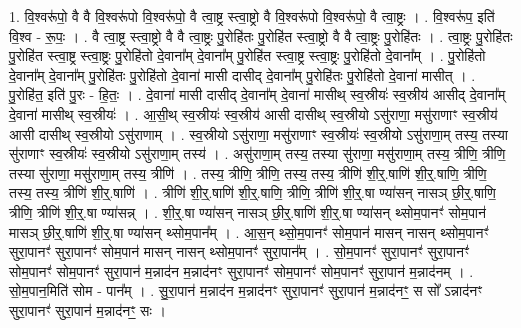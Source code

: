 \documentclass[17pt]{extarticle}
\begin{document}
1. वि॒श्वरू॑पो॒ वै वै वि॒श्वरू॑पो वि॒श्वरू॑पो॒ वै त्वा॒ष्ट्र स्त्वा॒ष्ट्रो वै वि॒श्वरू॑पो वि॒श्वरू॑पो॒ वै त्वा॒ष्ट्रः । . वि॒श्वरू॑प॒ इति॑ वि॒श्व - रू॒पः॒ । . वै त्वा॒ष्ट्र स्त्वा॒ष्ट्रो वै वै त्वा॒ष्ट्रः पु॒रोहि॑तः पु॒रोहि॑त स्त्वा॒ष्ट्रो वै वै त्वा॒ष्ट्रः पु॒रोहि॑तः । . त्वा॒ष्ट्रः पु॒रोहि॑तः पु॒रोहि॑त स्त्वा॒ष्ट्र स्त्वा॒ष्ट्रः पु॒रोहि॑तो दे॒वाना᳚म् दे॒वाना᳚म् पु॒रोहि॑त स्त्वा॒ष्ट्र स्त्वा॒ष्ट्रः पु॒रोहि॑तो दे॒वाना᳚म् । . पु॒रोहि॑तो दे॒वाना᳚म् दे॒वाना᳚म् पु॒रोहि॑तः पु॒रोहि॑तो दे॒वाना॑ मासी दासीद् दे॒वाना᳚म् पु॒रोहि॑तः पु॒रोहि॑तो दे॒वाना॑ मासीत् । . पु॒रोहि॑त॒ इति॑ पु॒रः - हि॒तः॒ । . दे॒वाना॑ मासी दासीद् दे॒वाना᳚म् दे॒वाना॑ मासीथ् स्व॒स्रीयः॑ स्व॒स्रीय॑ आसीद् दे॒वाना᳚म् दे॒वाना॑ मासीथ् स्व॒स्रीयः॑ । . आ॒सी॒थ् स्व॒स्रीयः॑ स्व॒स्रीय॑ आसी दासीथ् स्व॒स्रीयो ऽसु॑राणा॒ मसु॑राणाꣳ स्व॒स्रीय॑ आसी दासीथ् स्व॒स्रीयो ऽसु॑राणाम् । . स्व॒स्रीयो ऽसु॑राणा॒ मसु॑राणाꣳ स्व॒स्रीयः॑ स्व॒स्रीयो ऽसु॑राणा॒म् तस्य॒ तस्या सु॑राणाꣳ स्व॒स्रीयः॑ स्व॒स्रीयो ऽसु॑राणा॒म् तस्य॑ । . असु॑राणा॒म् तस्य॒ तस्या सु॑राणा॒ मसु॑राणा॒म् तस्य॒ त्रीणि॒ त्रीणि॒ तस्या सु॑राणा॒ मसु॑राणा॒म् तस्य॒ त्रीणि॑ । . तस्य॒ त्रीणि॒ त्रीणि॒ तस्य॒ तस्य॒ त्रीणि॑ शी॒र्॒.षाणि॑ शी॒र्॒.षाणि॒ त्रीणि॒ तस्य॒ तस्य॒ त्रीणि॑ शी॒र्॒.षाणि॑ । . त्रीणि॑ शी॒र्॒.षाणि॑ शी॒र्॒.षाणि॒ त्रीणि॒ त्रीणि॑ शी॒र्॒.षा ण्या॑सन् नासञ् छी॒र्॒.षाणि॒ त्रीणि॒ त्रीणि॑ शी॒र्॒.षा ण्या॑सन्न् । . शी॒र्॒.षा ण्या॑सन् नासञ् छी॒र्॒.षाणि॑ शी॒र्॒.षा ण्या॑सन् थ्सोम॒पानꣳ॑ सोम॒पान॑ मासञ् छी॒र्॒.षाणि॑ शी॒र्॒.षा ण्या॑सन् थ्सोम॒पान᳚म् । . आ॒स॒न् थ्सो॒म॒पानꣳ॑ सोम॒पान॑ मासन् नासन् थ्सोम॒पानꣳ॑ सुरा॒पानꣳ॑ सुरा॒पानꣳ॑ सोम॒पान॑ मासन् नासन् थ्सोम॒पानꣳ॑ सुरा॒पान᳚म् । . सो॒म॒पानꣳ॑ सुरा॒पानꣳ॑ सुरा॒पानꣳ॑ सोम॒पानꣳ॑ सोम॒पानꣳ॑ सुरा॒पान॑ म॒न्नाद॑न म॒न्नाद॑नꣳ सुरा॒पानꣳ॑ सोम॒पानꣳ॑ सोम॒पानꣳ॑ सुरा॒पान॑ म॒न्नाद॑नम् । . सो॒म॒पान॒मिति॑ सोम - पान᳚म् । . सु॒रा॒पान॑ म॒न्नाद॑न म॒न्नाद॑नꣳ सुरा॒पानꣳ॑ सुरा॒पान॑ म॒न्नाद॑नꣳ॒॒ स सो᳚ ऽन्नाद॑नꣳ सुरा॒पानꣳ॑ सुरा॒पान॑ म॒न्नाद॑नꣳ॒॒ सः । \newline
\end{document}
